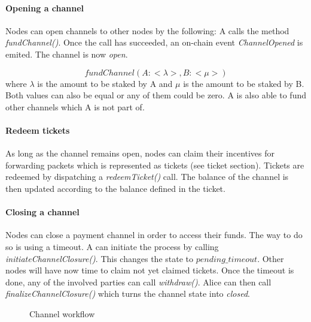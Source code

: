 \paragraph{Opening a channel} Nodes can open channels to other nodes by the following:
A calls the method \textit{fundChannel()}. Once the call has succeeded, an on-chain event \textit{ChannelOpened} is emited. The channel is now \textit{open}.


$$fundChannel(A: <\lambda>, B: <\mu>)$$ where $\lambda$ is the amount to be staked by A and $\mu$ is the amount to be staked by B. Both values can also be equal or any of them could be zero. A is also able to fund other channels which A is not part of.

\paragraph{Redeem tickets}
As long as the channel remains open, nodes can claim their incentives for forwarding packets which is represented as tickets (see ticket section). Tickets are redeemed by dispatching a \textit{redeemTicket()} call. The balance of the channel is then updated according to the balance defined in the ticket.
\paragraph{Closing a channel}
Nodes can close a payment channel in order to access their funds. The way to do so is using a timeout.
A can initiate the process by calling \textit{initiateChannelClosure()}. This changes the state to $pending\_timeout$. Other nodes will have now time to claim not yet claimed tickets. Once the timeout is done, any of the involved parties can call \textit{withdraw()}. Alice can then call \textit{finalizeChannelClosure()} which turns the channel state into \textit{closed}.

\begin{figure}[H]
    \centering
    \label{fig:channel workflow}
    \caption{Channel workflow}
\end{figure}
